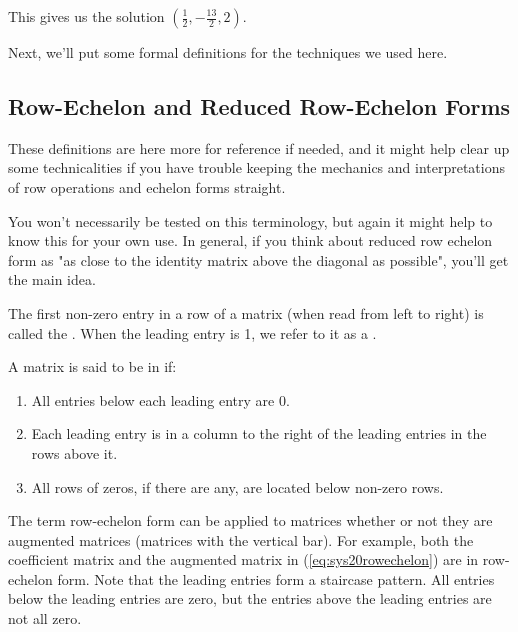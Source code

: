 \documentclass{ximera}
\begin{document}
This gives us the solution $(\frac{1}{2}, -\frac{13}{2}, 2)$.

Next, we'll put some formal definitions for the techniques we used here.
 

 
\subsection*{Row-Echelon and Reduced Row-Echelon Forms}

These definitions are here more for reference if needed, and it might help clear up some technicalities if you have trouble keeping the mechanics and interpretations of row operations and echelon forms straight. 

You won't necessarily be tested on this terminology, but again it might help to know this for your own use. In general, if you think about reduced row echelon form as "as close to the identity matrix above the diagonal as possible", you'll get the main idea.


 
\begin{definition}\label{def:leadentry} The first non-zero entry in a row of a matrix (when read from left to right) is called the .  When the leading entry is 1, we refer to it as a .
\end{definition}


 
\begin{definition}\label{def:ref}
A matrix is said to be in  if:
\begin{enumerate}
\item All entries below each leading entry are 0.
\item Each leading entry is in a column to the right of the leading entries in the rows above it.
\item All rows of zeros, if there are any, are located below non-zero rows.
\end{enumerate}
\end{definition}
 
The term row-echelon form can be applied to matrices whether or not they are augmented matrices (matrices with the vertical bar). For example, both the coefficient matrix and the augmented matrix in (\ref{eq:sys20rowechelon}) are in row-echelon form.  Note that the leading entries form a staircase pattern. All entries below the leading entries are zero, but the entries above the leading entries are not all zero.
 
\end{document}
